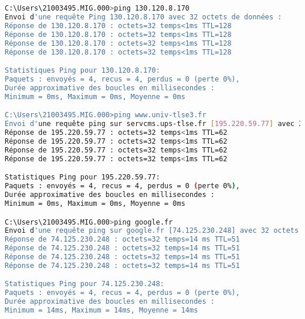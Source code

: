 \documentclass[a4paper, 11pt]{article}
\begin{document}
	\subsection{}
\begin{lstlisting}[language=bash, basicstyle=\scriptsize\ttfamily]
C:\Users\21003495.MIG.000>ping 130.120.8.170
Envoi d'une requête Ping 130.120.8.170 avec 32 octets de données :
Réponse de 130.120.8.170 : octets=32 temps<1ms TTL=128
Réponse de 130.120.8.170 : octets=32 temps<1ms TTL=128
Réponse de 130.120.8.170 : octets=32 temps<1ms TTL=128
Réponse de 130.120.8.170 : octets=32 temps<1ms TTL=128

Statistiques Ping pour 130.120.8.170:
Paquets : envoyés = 4, recus = 4, perdus = 0 (perte 0%),
Durée approximative des boucles en millisecondes :
Minimum = 0ms, Maximum = 0ms, Moyenne = 0ms

C:\Users\21003495.MIG.000>ping www.univ-tlse3.fr
Envoi d'une requête ping sur servcms.ups-tlse.fr [195.220.59.77] avec 32 octets de données :
Réponse de 195.220.59.77 : octets=32 temps<1ms TTL=62
Réponse de 195.220.59.77 : octets=32 temps<1ms TTL=62
Réponse de 195.220.59.77 : octets=32 temps<1ms TTL=62
Réponse de 195.220.59.77 : octets=32 temps<1ms TTL=62

Statistiques Ping pour 195.220.59.77:
Paquets : envoyés = 4, recus = 4, perdus = 0 (perte 0%),
Durée approximative des boucles en millisecondes :
Minimum = 0ms, Maximum = 0ms, Moyenne = 0ms

C:\Users\21003495.MIG.000>ping google.fr
Envoi d'une requête ping sur google.fr [74.125.230.248] avec 32 octets de données :
Réponse de 74.125.230.248 : octets=32 temps=14 ms TTL=51
Réponse de 74.125.230.248 : octets=32 temps=14 ms TTL=51
Réponse de 74.125.230.248 : octets=32 temps=14 ms TTL=51
Réponse de 74.125.230.248 : octets=32 temps=14 ms TTL=51

Statistiques Ping pour 74.125.230.248:
Paquets : envoyés = 4, recus = 4, perdus = 0 (perte 0%),
Durée approximative des boucles en millisecondes :
Minimum = 14ms, Maximum = 14ms, Moyenne = 14ms
	\end{lstlisting}
	\subsubsection{}
\end{document}
